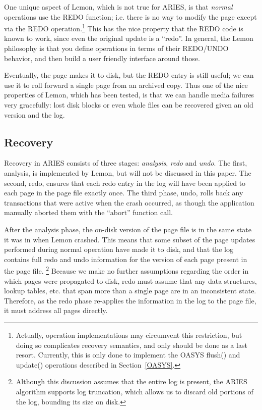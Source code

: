 \documentclass[letterpaper,twocolumn,english]{article}
\newcommand{\yad}{Lemon\xspace}
\begin{document}
One unique aspect of \yad, which is not true for ARIES, is that {\em
normal} operations use the REDO function; i.e. there is no way to
modify the page except via the REDO operation.\footnote{Actually,
operation implementations may circumvent this restriction, but doing
so complicates recovery semantics, and only should be done as a last
resort.  Currently, this is only done to implement the OASYS flush()
and update() operations described in Section~\ref{OASYS}.}  This has
the nice property that the REDO code is known to work, since even the
original update is a ``redo''.  In general, the \yad philosophy is
that you define operations in terms of their REDO/UNDO behavior, and
then build a user friendly interface around those.

Eventually, the page makes it to disk, but the REDO entry is still
useful; we can use it to roll forward a single page from an archived
copy.  Thus one of the nice properties of \yad, which has been
tested, is that we can handle media failures very gracefully: lost
disk blocks or even whole files can be recovered given an old version
and the log.  

\subsection{Recovery}

%

Recovery in ARIES consists of three stages: {\em analysis}, {\em redo} and {\em undo}. 
The first, analysis, is
implemented by \yad, but will not be discussed in this
paper. The second, redo, ensures that each redo entry in the log 
will have been applied to each page in the page file exactly once.
The third phase, undo, rolls back any transactions that were active
when the crash occurred, as though the application manually aborted
them with the {}``abort'' function call.
  
After the analysis phase, the on-disk version of the page file
is in the same state it was in when \yad crashed. This means that
some subset of the page updates performed during normal operation
have made it to disk, and that the log contains full redo and undo
information for the version of each page present in the page file.%
\footnote{Although this discussion assumes that the entire log is present, the
ARIES algorithm supports log truncation, which allows us to discard
old portions of the log, bounding its size on disk.%
} Because we make no further assumptions regarding the order in which
pages were propagated to disk, redo must assume that any
data structures, lookup tables, etc. that span more than a single
page are in an inconsistent state. Therefore, as the redo phase re-applies
 the information in the log to the page file, it must address all pages directly. 
\end{document}
